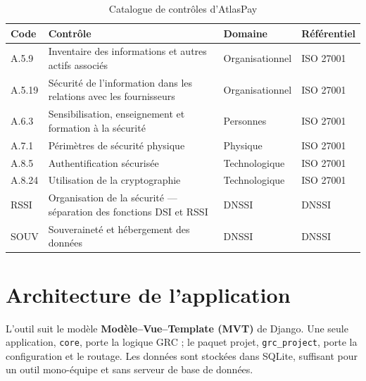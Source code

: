 \documentclass[11pt,a4paper]{article}
\newcommand{\code}[1]{\texttt{#1}}
\begin{document}
\begin{table}[H]
\centering\small
\begin{tabularx}{\linewidth}{@{}lXll@{}}
\toprule
\textbf{Code} & \textbf{Contrôle} & \textbf{Domaine} & \textbf{Référentiel}\\
\midrule
A.5.9  & Inventaire des informations et autres actifs associés & Organisationnel & ISO 27001\\
A.5.19 & Sécurité de l'information dans les relations avec les fournisseurs & Organisationnel & ISO 27001\\
A.6.3  & Sensibilisation, enseignement et formation à la sécurité & Personnes & ISO 27001\\
A.7.1  & Périmètres de sécurité physique & Physique & ISO 27001\\
A.8.5  & Authentification sécurisée & Technologique & ISO 27001\\
A.8.24 & Utilisation de la cryptographie & Technologique & ISO 27001\\
RSSI   & Organisation de la sécurité --- séparation des fonctions DSI et RSSI & DNSSI & DNSSI\\
SOUV   & Souveraineté et hébergement des données & DNSSI & DNSSI\\
\bottomrule
\end{tabularx}
\caption{Catalogue de contrôles d'AtlasPay}
\end{table}

\section{Architecture de l'application}
L'outil suit le modèle \textbf{Modèle--Vue--Template (MVT)} de Django. Une seule application, \code{core}, porte la logique GRC ; le paquet projet, \code{grc\_project}, porte la configuration et le routage. Les données sont stockées dans SQLite, suffisant pour un outil mono-équipe et sans serveur de base de données.
\end{document}
